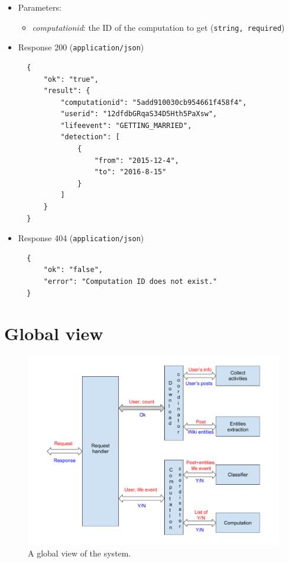 \begin{itemize}
\item
  Parameters:

  \begin{itemize}
  \item
    \textit{computationid}: the ID of the computation to get (\texttt{string, required})
  \end{itemize}
\item
  Response 200 (\texttt{application/json})

\begin{verbatim}
  {
      "ok": "true",
      "result": {
          "computationid": "5add910030cb954661f458f4",
          "userid": "12dfdbGRqaS34D5Hth5PaXsw",
          "lifeevent": "GETTING_MARRIED",
          "detection": [
              {
                  "from": "2015-12-4",
                  "to": "2016-8-15"
              }
          ]
      }
  }
\end{verbatim}

\item
  Response 404 (\texttt{application/json})

\begin{verbatim}
  {
      "ok": "false",
      "error": "Computation ID does not exist."
  }
\end{verbatim}
\end{itemize}

\section{Global view}

\begin{figure}
\centering
\includegraphics[width=%
1.0\textwidth]{img/Globalview}
\caption{A global view of the system.}
\label{fig:globalview}
\end{figure}

